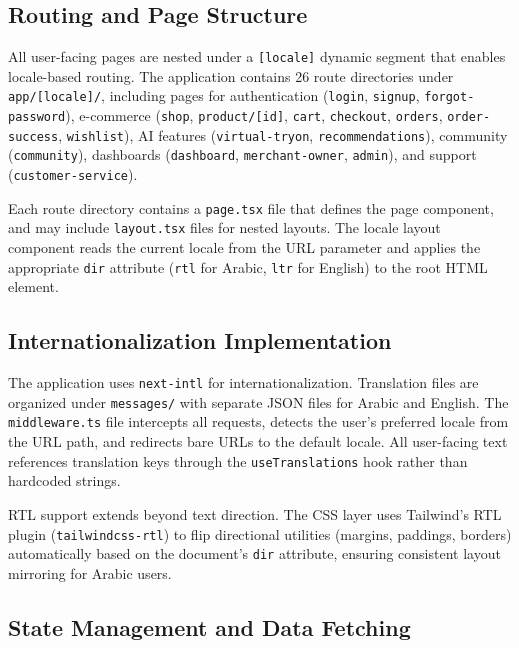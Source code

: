 \subsection{Routing and Page Structure}

All user-facing pages are nested under a \texttt{[locale]} dynamic segment that enables locale-based routing. The application contains 26 route directories under \texttt{app/[locale]/}, including pages for authentication (\texttt{login}, \texttt{signup}, \texttt{forgot-password}), e-commerce (\texttt{shop}, \texttt{product/[id]}, \texttt{cart}, \texttt{checkout}, \texttt{orders}, \texttt{order-success}, \texttt{wishlist}), AI features (\texttt{virtual-tryon}, \texttt{recommendations}), community (\texttt{community}), dashboards (\texttt{dashboard}, \texttt{merchant-owner}, \texttt{admin}), and support (\texttt{customer-service}).

Each route directory contains a \texttt{page.tsx} file that defines the page component, and may include \texttt{layout.tsx} files for nested layouts. The locale layout component reads the current locale from the URL parameter and applies the appropriate \texttt{dir} attribute (\texttt{rtl} for Arabic, \texttt{ltr} for English) to the root HTML element.

\subsection{Internationalization Implementation}

The application uses \texttt{next-intl} for internationalization. Translation files are organized under \texttt{messages/} with separate JSON files for Arabic and English. The \texttt{middleware.ts} file intercepts all requests, detects the user's preferred locale from the URL path, and redirects bare URLs to the default locale. All user-facing text references translation keys through the \texttt{useTranslations} hook rather than hardcoded strings.

RTL support extends beyond text direction. The CSS layer uses Tailwind's RTL plugin (\texttt{tailwindcss-rtl}) to flip directional utilities (margins, paddings, borders) automatically based on the document's \texttt{dir} attribute, ensuring consistent layout mirroring for Arabic users.

\subsection{State Management and Data Fetching}

